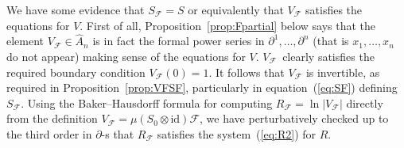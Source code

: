 \documentclass[pdftex]{sigma}
\def\id{\mathrm{id}}
\numberwithin{equation}{section}
\begin{document}
We have some evidence that $S_{\mathcal{F}} = S$ or equivalently that $V_{\mathcal{F}}$ satisfies the equations for $V$. First of all, Proposition~\ref{prop:Fpartial} below says that the element $V_{\mathcal{F}}\in\hat{A}_n$ is in fact the formal power series in $\partial^1,\dots,\partial^n$ (that is $x_1,\dots, x_n$ do not appear) making sense of the equations for $V$. $V_{\mathcal{F}}$~clearly satisfies the required boundary condition $V_{\mathcal{F}}(0) = 1$. It follows that $V_{\mathcal{F}}$ is invertible, as required in Proposition~\ref{prop:VFSF}, particularly in equation~(\ref{eq:SF}) defining $S_{\mathcal{F}}$. Using the Baker--Hausdorff formula for computing $R_\mathcal{F} = \ln|V_{\mathcal{F}}|$ directly from the definition $V_{\mathcal{F}}=\mu(S_0\otimes\id)\mathcal{F}$, we have perturbatively checked up to the third order in $\partial$-s that $R_{\mathcal{F}}$ satisfies the system~(\ref{eq:R2}) for $R$.
\end{document}
